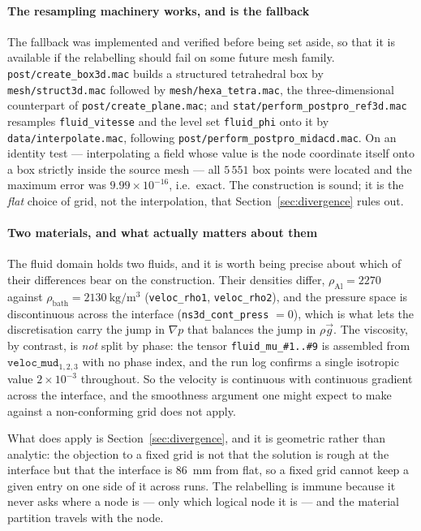 \documentclass[11pt,a4paper]{article}
\theoremstyle{plain}
\theoremstyle{definition}
\theoremstyle{remark}
\begin{document}
\paragraph{The resampling machinery works, and is the fallback}
The fallback was implemented and verified before being set aside, so that it is
available if the relabelling should fail on some future mesh family.
\texttt{post/create\_box3d.mac} builds a structured tetrahedral box by
\texttt{mesh/struct3d.mac} followed by \texttt{mesh/hexa\_tetra.mac}, the
three-dimensional counterpart of \texttt{post/create\_plane.mac}; and
\texttt{stat/perform\_postpro\_ref3d.mac} resamples \texttt{fluid\_vitesse} and
the level set \texttt{fluid\_phi} onto it by \texttt{data/interpolate.mac},
following \texttt{post/perform\_postpro\_midacd.mac}. On an identity test ---
interpolating a field whose value is the node coordinate itself onto a box
strictly inside the source mesh --- all $5\,551$ box points were located and the
maximum error was $9.99\times10^{-16}$, i.e.\ exact. The construction is sound;
it is the \emph{flat} choice of grid, not the interpolation, that
Section~\ref{sec:divergence} rules out.

\label{rem:two-materials}
\paragraph{Two materials, and what actually matters about them}
The fluid domain holds two fluids, and it is worth being precise about which of
their differences bear on the construction. Their densities differ,
$\rho_{\text{Al}} = 2270$ against $\rho_{\text{bath}} = 2130\ \mathrm{kg/m^3}$
(\texttt{veloc\_rho1}, \texttt{veloc\_rho2}), and the pressure space is
discontinuous across the interface (\texttt{ns3d\_cont\_press} $= 0$), which is
what lets the discretisation carry the jump in $\nabla p$ that balances the jump
in $\rho \vec g$. The viscosity, by contrast, is \emph{not} split by phase: the
tensor \texttt{fluid\_mu\_\#1..\#9} is assembled from
$\texttt{veloc\_mud}_{1,2,3}$ with no phase index, and the run log confirms a
single isotropic value $2\times10^{-3}$ throughout. So the velocity is
continuous with continuous gradient across the interface, and the smoothness
argument one might expect to make against a non-conforming grid does not apply.

What does apply is Section~\ref{sec:divergence}, and it is geometric rather than
analytic: the objection to a fixed grid is not that the solution is rough at the
interface but that the interface is $86$~mm from flat, so a fixed grid cannot
keep a given entry on one side of it across runs. The relabelling is immune
because it never asks where a node is --- only which logical node it is --- and
the material partition travels with the node.
\end{document}
